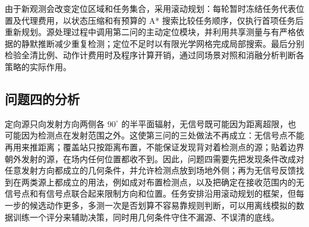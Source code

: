 由于新观测会改变定位区域和任务集合，采用滚动规划：每轮暂时冻结任务代表位置及代理费用，以状态压缩和有预算的 A* 搜索比较任务顺序，仅执行首项任务后重新规划。源处理过程中调用第二问的主动定位模块，并利用共享测量与有严格依据的静默推断减少重复检测；定位不足时以有限光学网格完成局部搜索。最后分别检验全清比例、动作计费用时及程序计算开销，通过同场景对照和消融分析判断各策略的实际作用。

\subsection{问题四的分析}

定向源只向发射方向两侧各 $90^\circ$ 的半平面辐射，无信号既可能因为距离超限，也可能因为检测点在发射范围之外。这使第三问的三处做法不再成立：无信号点不能再用来推距离；覆盖站只按距离布置，不能保证发现背对着检测点的源；贴着边界朝外发射的源，在场内任何位置都收不到。因此，问题四需要先把发现条件改成对任意发射方向都成立的几何条件，并允许检测点放到场地外侧；再为无信号反馈找到在两类源上都成立的用法，例如成对布置检测点，以及把确定在接收范围内的无信号点和有信号点联合起来限制方向和位置。任务安排沿用滚动规划的框架，但每一步的候选动作更多，多测一次是否划算不容易靠规则判断，可以用离线模拟的数据训练一个评分来辅助决策，同时用几何条件守住不漏源、不误清的底线。

